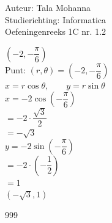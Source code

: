 \documentclass[a4paper]{article}
\begin{document}
\noindent \large Auteur: Tala Mohanna \\
\noindent \large Studierichting: Informatica\\
\noindent \large Oefeningenreeks 1C nr. 1.2\\

\medskip

\normalsize
$\left(-2,-\dfrac{\pi}{6} \right)$\\

Punt: $\left( r,\theta \right) = \left(-2, -\dfrac{\pi}{6}\right)$\\

$x = r\cos\theta,\qquad y= r\sin\theta$\\

$x = -2\cos\left(-\dfrac{\pi}{6} \right)$\\

$ =-2\cdot\dfrac{\sqrt{3}}{2} $\\

$ =-\sqrt{3}$\\

$y = -2\sin \left(-\dfrac{\pi}{6}\right) $\\

$ = -2\cdot\left(-\dfrac{1}{2}\right) $\\

$ =1$\\

$\boxed{\left(-\sqrt{3},1 \right)}$\\


\begin{thebibliography}{999}
\end{thebibliography}
\end{document}
